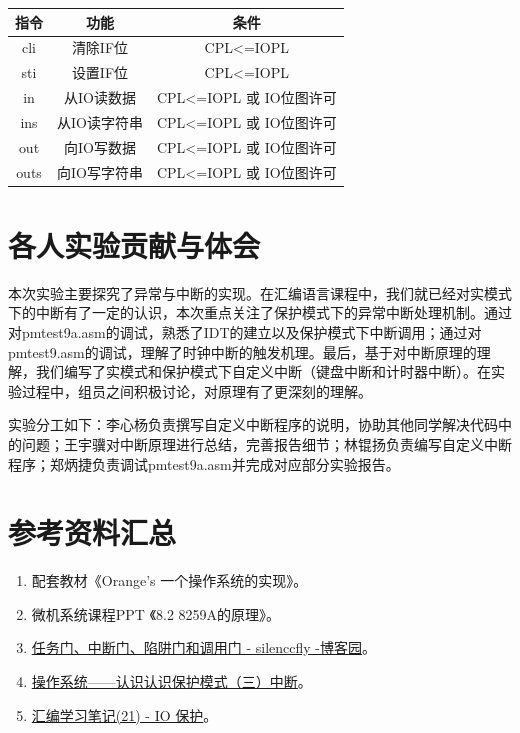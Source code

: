 \documentclass[UTF8,12pt]{ctexart}
\begin{document}
    \begin{table}[H]
    \centering
    \begin{tabular}{|c|c|c|}
    \hline
    {\color[HTML]{333333} \textbf{指令}} & \textbf{功能} & \textbf{条件}                  \\ \hline
    cli                                & 清除IF位       & CPL\textless{}=IOPL          \\ \hline
    sti                                & 设置IF位       & CPL\textless{}=IOPL          \\ \hline
    in                                 & 从IO读数据      & CPL\textless{}=IOPL 或 IO位图许可 \\ \hline
    ins                                & 从IO读字符串     & CPL\textless{}=IOPL 或 IO位图许可 \\ \hline
    out                                & 向IO写数据      & CPL\textless{}=IOPL 或 IO位图许可 \\ \hline
    outs                               & 向IO写字符串     & CPL\textless{}=IOPL 或 IO位图许可 \\ \hline
    \end{tabular}
    \end{table}
    
    \section{各人实验贡献与体会}
    本次实验主要探究了异常与中断的实现。在汇编语言课程中，我们就已经对实模式下的中断有了一定的认识，本次重点关注了保护模式下的异常中断处理机制。通过对pmtest9a.asm的调试，熟悉了IDT的建立以及保护模式下中断调用；通过对pmtest9.asm的调试，理解了时钟中断的触发机理。最后，基于对中断原理的理解，我们编写了实模式和保护模式下自定义中断（键盘中断和计时器中断）。在实验过程中，组员之间积极讨论，对原理有了更深刻的理解。
    
    实验分工如下：李心杨负责撰写自定义中断程序的说明，协助其他同学解决代码中的问题；王宇骥对中断原理进行总结，完善报告细节；林锟扬负责编写自定义中断程序；郑炳捷负责调试pmtest9a.asm并完成对应部分实验报告。
    
    
    
    \section*{参考资料汇总}
    \begin{enumerate}
        \item 配套教材《Orange's 一个操作系统的实现》。
        \item 微机系统课程PPT 《8.2 8259A的原理》。
        \item \href{
        https://www.cnblogs.com/mainull/p/7821255.html}{任务门、中断门、陷阱门和调用门 - silenccfly -博客园}。
        \item \href{https://blog.csdn.net/HizT_1999/article/details/106989155}{操作系统——认识认识保护模式（三）中断}。
        \item \href{https://www.cnblogs.com/alwaysking/p/12348016.html}{汇编学习笔记(21) - IO 保护}。
    \end{enumerate}
    
\end{document}
